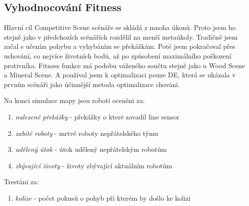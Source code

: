 \subsection*{Vyhodnocování Fitness}
Hlavní cíl Competitive Scene scénáře se skládá z mnoha úkonů. Proto jsem ho stejně jako v předchozích scénářích rozdělil na menší metaúkoly. Tradičně jsem začal s učením pohybu a vyhybáním se překážkám. Poté jsem pokračoval přes uchování, co nejvíce životních bodů, až po způsobení maximálního poškození protivníka. Fitness funkce má podobu váženého součtu stejně jako u Wood Scene a Mineral Scene. A používal jsem k optimalizaci pouze DE, která se ukázala v prvním scénáři jako účinnější metoda optimalizace chování. 
\par 
Na konci simulace mapy jsou roboti oceněni za:  
\begin{enumerate}
	\item \textit{nalezené překážky} - překážky o které zavadil line sensor
	\item \textit{zabité roboty} - mrtvé roboty nepřátelského týmu
	\item \textit{udělený útok} - útok udělený nepřátelským robotům 
	\item \textit{zbývající životy} - životy zbývající aktuálním robotům
\end{enumerate}
Trestáni za:
\begin{enumerate}
	\item \textit{kolize} - počet pokusů o pohyb při kterém by došlo ke kolizi 
\end{enumerate}


